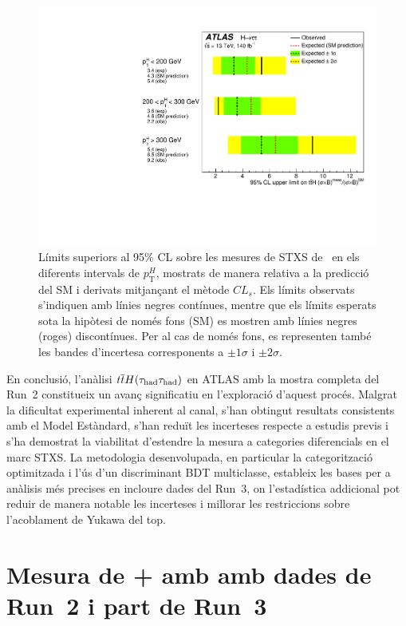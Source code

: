 \begin{figure}[h]
  \centering
  \includegraphics[width=0.70\linewidth]{images/fit_stxs/fig_08.pdf} %
  \caption{Límits superiors al 95\% CL sobre les mesures de STXS de \ttH\ en els diferents intervals de $p_{\mathrm{T}}^{H}$, mostrats de manera relativa a la predicció del SM i derivats mitjançant el mètode $CL_s$.  
  Els límits observats s’indiquen amb línies negres contínues, mentre que els límits esperats sota la hipòtesi de només fons (SM) es mostren amb línies negres (roges) discontínues.  
  Per al cas de només fons, es representen també les bandes d’incertesa corresponents a $\pm 1\sigma$ i $\pm 2\sigma$.}
    \label{res:tth_cls_limits}
\end{figure}

En conclusió, l’anàlisi \(t\overline{t}H(\tau_{\mathrm{had}}\tau_{\mathrm{had}})\) en ATLAS amb la mostra completa del Run~2 constitueix un avanç significatiu en l’exploració d’aquest procés.  
Malgrat la dificultat experimental inherent al canal, s’han obtingut resultats consistents amb el Model Estàndard, s’han reduït les incerteses respecte a estudis previs i s’ha demostrat la viabilitat d’estendre la mesura a categories diferencials en el marc STXS.  
La metodologia desenvolupada, en particular la categorització optimitzada i l’ús d’un discriminant BDT multiclasse, estableix les bases per a anàlisis més precises en incloure dades del Run~3, on l’estadística addicional pot reduir de manera notable les incerteses i millorar les restriccions sobre l’acoblament de Yukawa del top.

\FloatBarrier


\section*{Mesura de \thqb + \ttH amb \htautau amb dades de Run~2 i part de Run~3}


